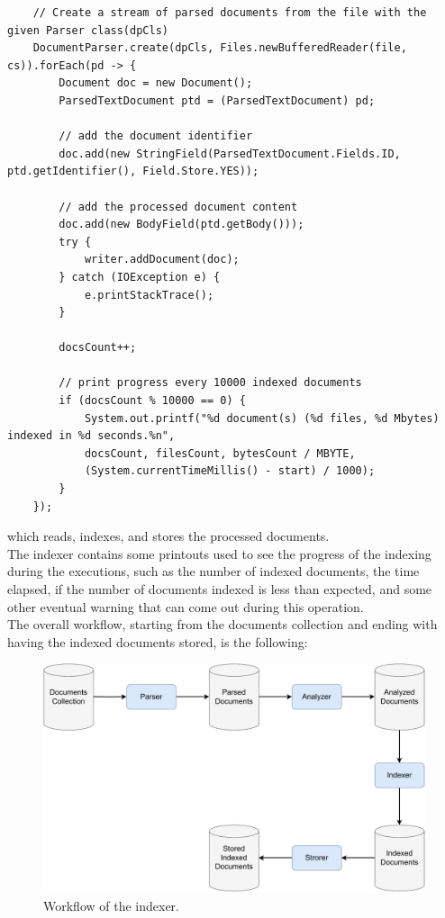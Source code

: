 \begin{lstlisting}
    // Create a stream of parsed documents from the file with the given Parser class(dpCls)
    DocumentParser.create(dpCls, Files.newBufferedReader(file, cs)).forEach(pd -> {
        Document doc = new Document();
        ParsedTextDocument ptd = (ParsedTextDocument) pd;

        // add the document identifier
        doc.add(new StringField(ParsedTextDocument.Fields.ID, ptd.getIdentifier(), Field.Store.YES));

        // add the processed document content
        doc.add(new BodyField(ptd.getBody()));
        try {
            writer.addDocument(doc);
        } catch (IOException e) {
            e.printStackTrace();
        }

        docsCount++;

        // print progress every 10000 indexed documents
        if (docsCount % 10000 == 0) {
            System.out.printf("%d document(s) (%d files, %d Mbytes) indexed in %d seconds.%n",
            docsCount, filesCount, bytesCount / MBYTE,
            (System.currentTimeMillis() - start) / 1000);
        }
    });
\end{lstlisting}
which reads, indexes, and stores the processed documents. \\
The indexer contains some printouts used to see the progress of the indexing during the executions, such as the number of indexed documents, the time elapsed, if the number of documents indexed is less than expected, and some other eventual warning that can come out during this operation. \\
The overall workflow, starting from the documents collection and ending with having the indexed documents stored, is the following:
\begin{figure}[!h]
    \centering
    \includegraphics[width=0.8\linewidth]{figure/Indexer_workflow.pdf}
    \caption{Workflow of the indexer.}
    \label{fig:Indexer_workflow}
\end{figure}


